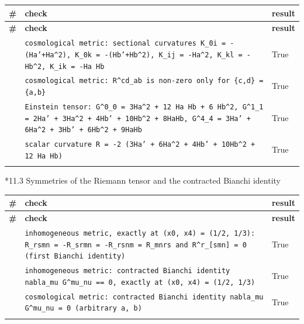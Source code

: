 \documentclass[10pt,a4paper]{article}
\makeatletter
\renewcommand\subsubsection{\@startsection{subsubsection}{3}{\z@}{-3.25ex\@plus -1ex \@minus -.2ex}{1.5ex \@plus .2ex}{\normalfont\normalsize\bfseries\raggedright}}
\makeatother
\begin{document}
{\footnotesize
\begin{longtable}{>{\raggedright\arraybackslash}p{}>{\raggedright\arraybackslash}p{}>{\raggedright\arraybackslash}p{}}
\toprule
\textbf{\#} & \textbf{check} & \textbf{result} \\
\midrule\endfirsthead
\toprule
\textbf{\#} & \textbf{check} & \textbf{result} \\
\midrule\endhead
\endfoot
\bottomrule\endlastfoot
204 & \texttt{cosmological metric: sectional curvatures K\_\allowbreak{}0i = -(Ha'+Ha\textasciicircum{}2), K\_\allowbreak{}0k = -(Hb'+Hb\textasciicircum{}2), K\_\allowbreak{}ij = -Ha\textasciicircum{}2, K\_\allowbreak{}kl = -Hb\textasciicircum{}2, K\_\allowbreak{}ik = -Ha Hb} & True \\
205 & \texttt{cosmological metric: R\textasciicircum{}cd\_\allowbreak{}ab is non-zero only for \{c,d\} = \{a,b\}} & True \\
206 & \texttt{Einstein tensor: G\textasciicircum{}0\_\allowbreak{}0 = 3Ha\textasciicircum{}2 + 12 Ha Hb + 6 Hb\textasciicircum{}2, G\textasciicircum{}1\_\allowbreak{}1 = 2Ha' + 3Ha\textasciicircum{}2 + 4Hb' + 10Hb\textasciicircum{}2 + 8HaHb, G\textasciicircum{}4\_\allowbreak{}4 = 3Ha' + 6Ha\textasciicircum{}2 + 3Hb' + 6Hb\textasciicircum{}2 + 9HaHb} & True \\
207 & \texttt{scalar curvature R = -2 (3Ha' + 6Ha\textasciicircum{}2 + 4Hb' + 10Hb\textasciicircum{}2 + 12 Ha Hb)} & True \\*
\end{longtable}}
\subsubsection*{11.3 Symmetries of the Riemann tensor and the contracted Bianchi identity}
{\footnotesize
\begin{longtable}{>{\raggedright\arraybackslash}p{}>{\raggedright\arraybackslash}p{}>{\raggedright\arraybackslash}p{}}
\toprule
\textbf{\#} & \textbf{check} & \textbf{result} \\
\midrule\endfirsthead
\toprule
\textbf{\#} & \textbf{check} & \textbf{result} \\
\midrule\endhead
\endfoot
\bottomrule\endlastfoot
208 & \texttt{inhomogeneous metric, exactly at (x0, x4) = (1/\allowbreak{}2, 1/\allowbreak{}3): R\_\allowbreak{}rsmn = -R\_\allowbreak{}srmn = -R\_\allowbreak{}rsnm = R\_\allowbreak{}mnrs and R\textasciicircum{}r\_\allowbreak{}[smn] = 0 (first Bianchi identity)} & True \\
209 & \texttt{inhomogeneous metric: contracted Bianchi identity nabla\_\allowbreak{}mu G\textasciicircum{}mu\_\allowbreak{}nu == 0, exactly at (x0, x4) = (1/\allowbreak{}2, 1/\allowbreak{}3)} & True \\
210 & \texttt{cosmological metric: contracted Bianchi identity nabla\_\allowbreak{}mu G\textasciicircum{}mu\_\allowbreak{}nu = 0 (arbitrary a, b)} & True \\*
\end{longtable}}
\end{document}
